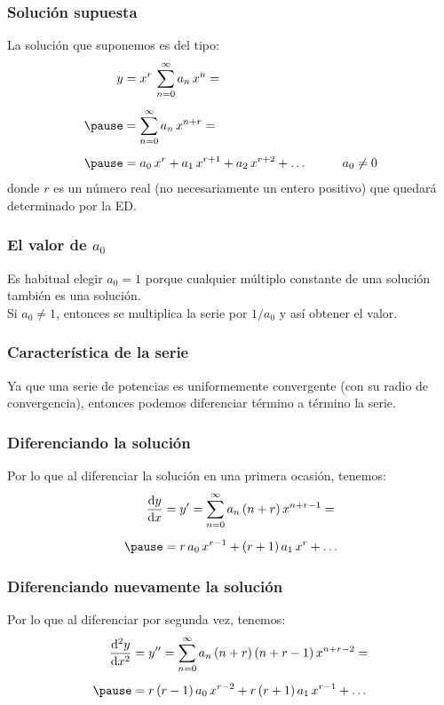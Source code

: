 \documentclass[12pt]{beamer}
\begin{document}
\begin{frame}
\frametitle{Solución supuesta}
La solución que suponemos es del tipo:
\begin{eqnarray}
\begin{aligned}
y &= x^{r} \, \sum_{n=0}^{\infty} a_{n} \, x^{n} = \\[0.5em] \pause
&= \sum_{n=0}^{\infty} a_{n} \, x^{n+r} = \\[0.5em] \pause
&= a_{0} \, x^{r} + a_{1} \, x^{r+1} + a_{2} \, x^{r+2} + \ldots \hspace{1cm} a_{0} \neq 0
\end{aligned}
\label{eq:ecuacion_26_08}    
\end{eqnarray}
donde $r$ es un número real (no necesariamente un entero positivo) que quedará determinado por la ED.
\end{frame}
\begin{frame}
\frametitle{El valor de $a_{0}$}
Es habitual elegir $a_{0} = 1$ porque cualquier múltiplo constante de una solución también es una solución.
\\
\bigskip
\pause
Si $a_{0} \neq 1$, entonces se multiplica la serie por $1/a_{0}$ y así obtener el valor.
\end{frame}
\begin{frame}
\frametitle{Característica de la serie}
Ya que una serie de potencias es uniformemente convergente (con su radio de convergencia), entonces podemos diferenciar término a término la serie.
\end{frame}
\begin{frame}
\frametitle{Diferenciando la solución}
Por lo que al diferenciar la solución en una primera ocasión, tenemos:
\begin{eqnarray}
\begin{aligned}
\dv{y}{x} &= \ptilde{y} = \sum_{n=0}^{\infty} a_{n} \, (n + r) \, x^{n+r-1} = \\[0.5em] \pause
&= r \, a_{0} \, x^{r-1} + (r + 1) \, a_{1} \, x^{r} + \ldots
\end{aligned}
\label{eq:ecuacion_26_09a}
\end{eqnarray}
\end{frame}
\begin{frame}
\frametitle{Diferenciando nuevamente la solución}
Por lo que al diferenciar por segunda vez, tenemos:
\begin{eqnarray}
\begin{aligned}
\dv[2]{y}{x} &= \stilde{y} =  \sum_{n=0}^{\infty} a_{n} \, (n + r) \, (n + r - 1) \, x^{n+r-2} = \\[0.5em] \pause
&= r \, (r - 1) \, a_{0} \, x^{r-2} + r \, (r + 1) \, a_{1} \, x^{r-1} + \ldots
\end{aligned}
\label{eq:ecuacion_26_09b}
\end{eqnarray}
\end{frame}
\end{document}
